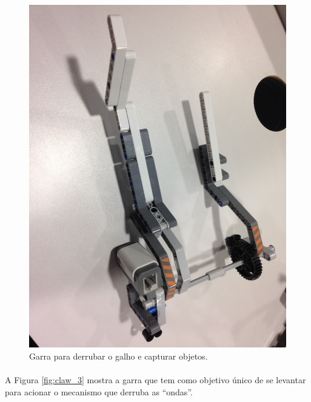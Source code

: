 \documentclass[12pt,a4paper]{article}
\begin{document}
	\begin{figure}[H]
		\includegraphics[width=\linewidth]{../Images/claw_2.JPG}
		\caption{Garra para derrubar o galho e capturar objetos.}
		\label{fig:claw_2}
	\end{figure}

	\paragraph{}
		A Figura \ref{fig:claw_3} mostra a garra que tem como objetivo único de 
		se levantar para acionar o mecanismo que derruba as “ondas”.	
\end{document}
